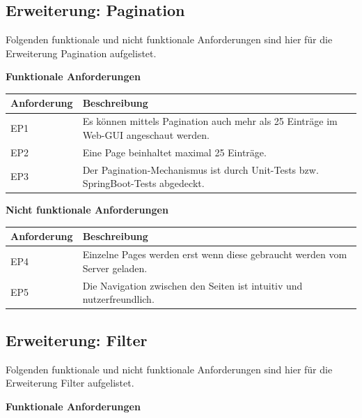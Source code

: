 \subsection{Erweiterung: Pagination}
Folgenden funktionale und nicht funktionale Anforderungen sind hier für die Erweiterung Pagination aufgelistet.\newline

\noindent \textbf{Funktionale Anforderungen}\newline

\noindent \begin{tabular}{|p{3cm}|p{12cm}|}
	\hline
	\textbf{Anforderung}  & \textbf{Beschreibung} \\ \hline
	EP1    & Es können mittels Pagination auch mehr als 25 Einträge im Web-GUI angeschaut werden.     \\ \hline
	EP2    & Eine Page beinhaltet maximal 25 Einträge.     \\ \hline
	EP3    & Der Pagination-Mechanismus ist durch Unit-Tests bzw. SpringBoot-Tests abgedeckt.     \\ \hline
\end{tabular} \newline

\noindent \textbf{Nicht funktionale Anforderungen}\newline

\noindent \begin{tabular}{|p{3cm}|p{12cm}|}
	\hline
	\textbf{Anforderung}  & \textbf{Beschreibung} \\ \hline
	EP4    & Einzelne Pages werden erst wenn diese gebraucht werden vom Server geladen.     \\ \hline
	EP5    & Die Navigation zwischen den Seiten ist intuitiv und nutzerfreundlich.     \\ \hline
\end{tabular}

\subsection{Erweiterung: Filter}
Folgenden funktionale und nicht funktionale Anforderungen sind hier für die Erweiterung Filter aufgelistet.\newline

\noindent \textbf{Funktionale Anforderungen}\newline

